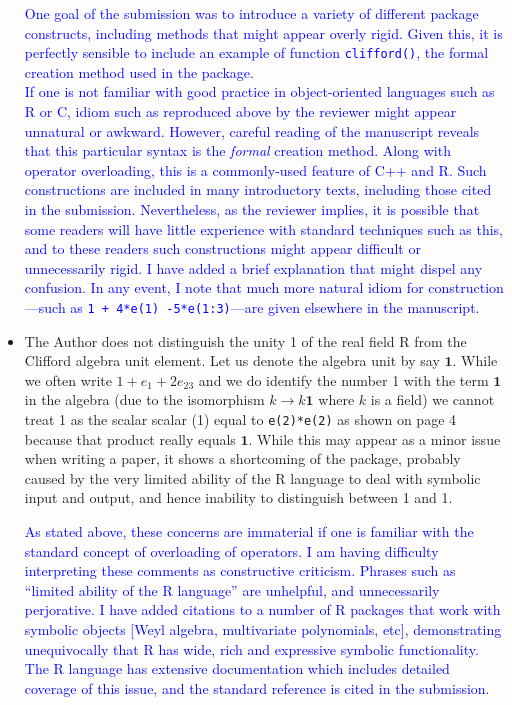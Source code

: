 \documentclass{article}
\begin{document}
\begin{itemize}
\textcolor{blue}{One goal of the submission was to introduce a variety
  of different package constructs, including methods that might appear
  overly rigid.  Given this, it is perfectly sensible to include an
  example of function {\tt clifford()}, the formal creation method
  used in the package.\\[10pt] If one is not familiar with good
  practice in object-oriented languages such as R or C, idiom such as
  reproduced above by the reviewer might appear unnatural or awkward.
  However, careful reading of the manuscript reveals that this
  particular syntax is the {\em formal} creation method.  Along with
  operator overloading, this is a commonly-used feature of C++ and R.
  Such constructions are included in many introductory texts,
  including those cited in the submission.  Nevertheless, as the
  reviewer implies, it is possible that some readers will have little
  experience with standard techniques such as this, and to these
  readers such constructions might appear difficult or unnecessarily
  rigid.  I have added a brief explanation that might dispel any
  confusion.  In any event, I note that much more natural idiom for
  construction---such as {\tt 1 + 4*e(1) -5*e(1:3)}---are given
  elsewhere in the manuscript.  }

\item The Author does not distinguish the unity 1 of the real field R
  from the Clifford algebra unit element. Let us denote the algebra
  unit by say $\mathbf{1}$. While we often write $1 + e_1 + 2e_{23}$
  and we do identify the number 1 with the term $\mathbf{1}$ in the
  algebra (due to the isomorphism $k\longrightarrow k\mathbf{1}$ where
  $k$ is a field) we cannot treat 1 as the scalar scalar (1) equal to
  \verb+e(2)*e(2)+ as shown on page 4 because that product really
  equals $\mathbf{1}$.  While this may appear as a minor issue when
  writing a paper, it shows a shortcoming of the package, probably
  caused by the very limited ability of the R language to deal with
  symbolic input and output, and hence inability to distinguish
  between 1 and 1.

  \textcolor{blue}{As stated above, these concerns are immaterial if
    one is familiar with the standard concept of overloading of
    operators.  I am having difficulty interpreting these comments as
    constructive criticism.  Phrases such as ``limited ability of the
    R language'' are unhelpful, and unnecessarily perjorative.  I have
    added citations to a number of R packages that work with symbolic
    objects [Weyl algebra, multivariate polynomials, etc],
    demonstrating unequivocally that R has wide, rich and expressive
    symbolic functionality.  The R language has extensive
    documentation which includes detailed coverage of this issue, and
    the standard reference is cited in the submission.}


\end{itemize}
\end{document}
